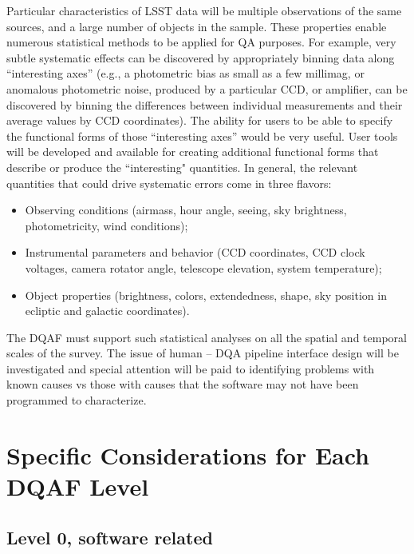 \documentclass[SE,toc,lsstdraft]{lsstdoc}
\newcommand{\newtext}[1]{{\color{blue} #1}}
\begin{document}
Particular characteristics of LSST data will be multiple observations of the same sources, and a large
number of objects in the sample. These properties enable numerous statistical methods to be applied
for QA purposes. For example, very subtle systematic effects can be discovered by appropriately binning
data along ``interesting axes''  (e.g., a photometric bias as small as a few millimag, or anomalous
photometric noise, produced by a particular CCD, or amplifier, can be discovered by binning the differences
between individual measurements and their average values by CCD coordinates).  The ability for users to be able to specify the functional forms of those ``interesting axes'' would be very useful.   User tools will be developed and available for creating additional functional forms that describe or produce the ``interesting" quantities.  In general, the relevant
quantities that could drive systematic errors come in three flavors:
\begin{itemize}
\item Observing conditions (airmass, hour angle, seeing, sky brightness, photometricity, wind conditions);
\item Instrumental parameters and behavior (CCD coordinates, \newtext{CCD clock voltages,} camera rotator angle, telescope elevation, system
         temperature);
\item Object properties (brightness, colors, extendedness, \newtext{shape,} sky position in ecliptic and galactic coordinates).
\end{itemize}


The DQAF must support such statistical analyses on all the spatial and temporal scales of the survey. The issue of human – DQA pipeline interface design will be investigated and special attention will be paid to identifying problems with known causes vs those with causes that the software may not have been programmed to characterize.




\section{Specific Considerations for Each DQAF Level}


\subsection{Level 0, software related}
\end{document}
